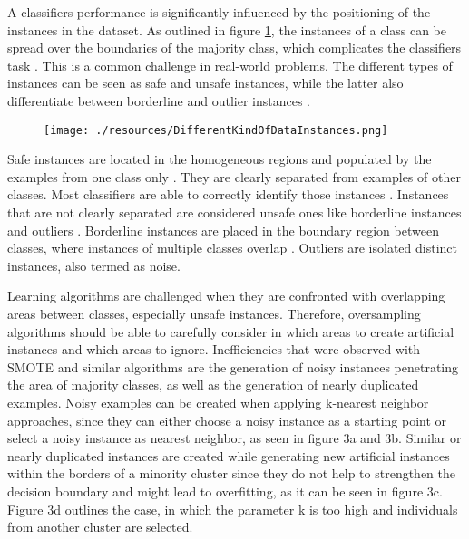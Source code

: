 \documentclass[parskip=full]{scrartcl}
\begin{document}
A classifiers performance is significantly influenced by the positioning of the instances in the 
dataset. As outlined in figure \ref{fig:Saez}, the instances of a class can be spread over the 
boundaries of the majority class, which complicates the classifiers task \cite{Tang}. This is a 
common challenge in real-world problems. The different types of instances can be seen as safe and 
unsafe instances, while the latter also differentiate between borderline and outlier instances \cite{Saez}.

\begin{figure}[H]
	\centering
	\texttt{[image: ./resources/DifferentKindOfDataInstances.png]}
	\label{fig:Saez}
\end{figure}

Safe instances are located in the homogeneous regions and populated by the examples from one class only 
\cite{rodriguez2012hybrid}. They are clearly separated from examples of other classes. Most classifiers 
are able to correctly identify those instances \cite{Prati2004B}. Instances that are not clearly separated 
are considered unsafe ones like borderline instances and outliers \cite{Kubat2000}. Borderline instances 
are placed in the boundary region between classes, where instances of multiple classes overlap \cite{Saez}. 
Outliers are isolated distinct instances, also termed as noise. 

Learning algorithms are challenged when they are confronted with overlapping areas between classes, especially 
unsafe instances. Therefore, oversampling algorithms should be able to carefully consider in which areas to
 create artificial instances and which areas to ignore. Inefficiencies that were observed with SMOTE and similar
  algorithms are the generation of noisy instances penetrating the area of majority classes, as well as the 
  generation of nearly duplicated examples. Noisy examples can be created when applying k-nearest neighbor 
  approaches, since they can either choose a noisy instance as a starting point or select a noisy instance as 
  nearest neighbor, as seen in figure 3a and 3b. Similar or nearly duplicated instances are created while 
  generating new artificial instances within the borders of a minority cluster since they do not help to 
  strengthen the decision boundary and might lead to overfitting, as it can be seen in figure 3c. Figure 3d 
  outlines the case, in which the parameter k is too high and individuals from another cluster are selected.
\end{document}
